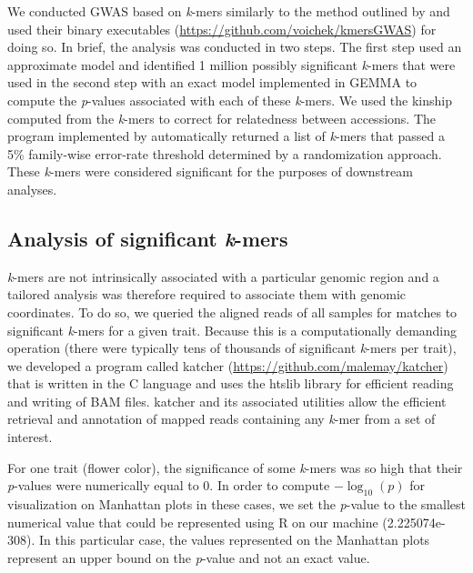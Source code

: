 We conducted GWAS based on \emph{k}-mers similarly to the method outlined by
\cite{voichek2020} and used their binary executables
(\url{https://github.com/voichek/kmersGWAS}) for doing so.  In brief, the
analysis was conducted in two steps. The first step used an approximate model
and identified 1 million possibly significant \emph{k}-mers that were used in
the second step with an exact model implemented in GEMMA \citep{zhou2012} to
compute the \emph{p}-values associated with each of these \emph{k}-mers. We
used the kinship computed from the \emph{k}-mers to correct for relatedness
between accessions. The program implemented by \cite{voichek2020} automatically
returned a list of \emph{k}-mers that passed a 5\% family-wise error-rate
threshold determined by a randomization approach.  These \emph{k}-mers were
considered significant for the purposes of downstream analyses.

\subsection{Analysis of significant \emph{k}-mers}
\label{sv-gwas-kmers-analysis-methods}

\emph{k}-mers are not intrinsically associated with a particular genomic region
and a tailored analysis was therefore required to associate them with genomic
coordinates. To do so, we queried the aligned reads of all samples for matches
to significant \emph{k}-mers for a given trait. Because this is a
computationally demanding operation (there were typically tens of thousands of
significant \emph{k}-mers per trait), we developed a program called katcher
(\url{https://github.com/malemay/katcher}) that is written in the C language
and uses the htslib library \citep{bonfield2021} for efficient reading and
writing of BAM files. katcher and its associated utilities allow the efficient
retrieval and annotation of mapped reads containing any \emph{k}-mer from a set
of interest.

For one trait (flower color), the significance of some \emph{k}-mers was so
high that their \emph{p}-values were numerically equal to 0. In order to
compute $-\log_{10} (p)$ for visualization on Manhattan plots in these cases,
we set the \emph{p}-value to the smallest numerical value that could be
represented using R on our machine (2.225074e-308). In this particular case,
the values represented on the Manhattan plots represent an upper bound on the
\emph{p}-value and not an exact value.


